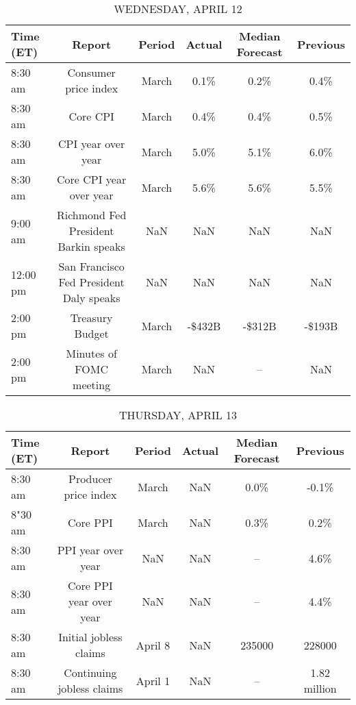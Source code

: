 \documentclass{article}%
\begin{document}
\begin{table}[htbp]%
\caption{WEDNESDAY, APRIL 12}%
\centering%
\begin{adjustbox}{width=1\textwidth}%
\begin{tabular}{lccccc}
\toprule
Time (ET) &                                  Report & Period & Actual & Median Forecast & Previous \\
\midrule
  8:30 am &                    Consumer price index &  March &   0.1\% &            0.2\% &     0.4\% \\
  8:30 am &                                Core CPI &  March &   0.4\% &            0.4\% &     0.5\% \\
  8:30 am &                      CPI year over year &  March &   5.0\% &            5.1\% &     6.0\% \\
  8:30 am &                 Core CPI year over year &  March &   5.6\% &            5.6\% &     5.5\% \\
  9:00 am &    Richmond Fed President Barkin speaks &    NaN &    NaN &             NaN &      NaN \\
 12:00 pm & San Francisco Fed President Daly speaks &    NaN &    NaN &             NaN &      NaN \\
  2:00 pm &                         Treasury Budget &  March & -\$432B &          -\$312B &   -\$193B \\
  2:00 pm &                 Minutes of FOMC meeting &  March &    NaN &              -- &      NaN \\
\bottomrule
\end{tabular}
%
\end{adjustbox}%
\end{table}

%


\begin{table}[htbp]%
\caption{THURSDAY, APRIL 13}%
\centering%
\begin{adjustbox}{width=1\textwidth}%
\begin{tabular}{lccccc}
\toprule
Time (ET) &                    Report &  Period & Actual & Median Forecast &     Previous \\
\midrule
  8:30 am &      Producer price index &   March &    NaN &            0.0\% &        -0.1\% \\
  8"30 am &                  Core PPI &   March &    NaN &            0.3\% &         0.2\% \\
  8:30 am &        PPI year over year &     NaN &    NaN &              -- &         4.6\% \\
  8:30 am &   Core PPI year over year &     NaN &    NaN &              -- &         4.4\% \\
  8:30 am &    Initial jobless claims & April 8 &    NaN &          235000 &       228000 \\
  8:30 am & Continuing jobless claims & April 1 &    NaN &              -- & 1.82 million \\
\bottomrule
\end{tabular}
%
\end{adjustbox}%
\end{table}
\end{document}
